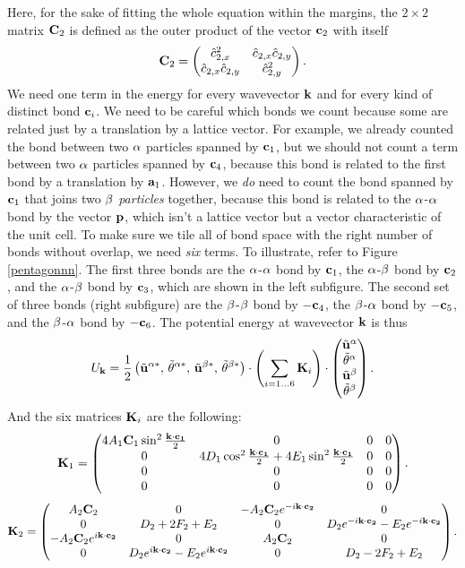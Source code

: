 \documentclass[12pt]{article}
\begin{document}
Here, for the sake of fitting the whole equation within the margins, the 
$2\times 2$ matrix $\mathbf{C}_2$ is defined as the outer product of the vector $\mathbf{c}_2$ with itself
\[ \mathbf{C}_2 = \left(\begin{matrix} \hat c_{2,x}^2 & \hat c_{2,x}\hat c_{2,y} \\ \hat 
c_{2,x}\hat c_{2,y} & \hat c_{2,y}^2 \end{matrix}\right).\]
We need one term in the energy for every wavevector $\mathbf{k}$ and for every kind 
of distinct bond $\mathbf{c}_i$. We need to be careful which bonds we count because 
some are related just by a translation by a lattice vector. For example, we 
already counted the bond between two $\alpha$ particles spanned by $\mathbf{c}_1$, but 
we should not count a term between two $\alpha$ particles spanned by $\mathbf{c}_4$, 
because this bond is related to the first bond by a translation by $\mathbf{a}_1$. 
However, we \emph{do} need to count the bond spanned by $\mathbf{c}_1$ that joins 
two $\beta$ \emph{particles} together, because this bond is related to the 
$\alpha$-$\alpha$ bond by the vector $\mathbf{p}$, which isn't a lattice vector but a vector 
characteristic of the unit cell. To make sure we tile all of bond space with 
the right number of bonds without overlap, we need \emph{six} terms. To 
illustrate, refer to Figure \ref{pentagonnn}. The first three bonds are the 
$\alpha$-$\alpha$ bond by $\mathbf{c}_1$, the $\alpha$-$\beta$ bond by $\mathbf{c}_2$, and the $\alpha$-$\beta$ 
bond by $\mathbf{c}_3$, which are shown in the left subfigure. The second set of 
three bonds (right subfigure) are the $\beta$-$\beta$ bond by $-\mathbf{c}_4$, the 
$\beta$-$\alpha$ bond by $-\mathbf{c}_5$, and the $\beta$-$\alpha$ bond by $-\mathbf{c}_6$. The 
potential energy at wavevector $\mathbf{k}$ is thus
\[ U_{\mathbf{k}} = \frac{1}{2} \left(\tilde {\mathbf{u}}^{\alpha *} 
, \, \tilde {\theta}^{\alpha *} , \, \tilde {\mathbf{u}}^{\beta *} , \, \tilde {\theta}^{\beta *} \right)\cdot 
\left( \sum_{i=1\ldots 6} \mathbf{K}_i \right) \cdot \left(\begin{matrix}\tilde {\mathbf{u}}^{\alpha} \\ \tilde 
{\theta}^{\alpha} \\ \tilde {\mathbf{u}}^{\beta} \\  \tilde {\theta}^{\beta} \end{matrix}\right).\]
And the six matrices $\mathbf{K}_i$ are the following:
\[ \mathbf{K}_1 = \left(\begin{matrix} 4A_1 \mathbf{C}_1 \sin^2 \frac{\mathbf{k}\cdot\mathbf{c_1}}{2} & 0 & 0 & 0\\ 0 & 
4D_1 \cos^2\frac{\mathbf{k}\cdot\mathbf{c_1}}{2} + 4E_1 \sin^2 \frac{\mathbf{k}\cdot\mathbf{c_1}}{2} & 0 & 0 \\ 
0 & 0 & 0 & 0 \\ 0 & 0 & 0 & 0\end{matrix}\right).\]
\[ \mathbf{K}_2 = \left(\begin{matrix}
 A_2\mathbf{C}_2 & 0 & -A_2 \mathbf{C}_2 e^{-i\mathbf{k}\cdot\mathbf{c_2}} & 0 \\
0 & D_2 + 2F_2 + E_2 & 0 & D_2e^{-i\mathbf{k}\cdot\mathbf{c_2}} - 
E_2e^{-i\mathbf{k}\cdot\mathbf{c_2}} \\
-A_2 \mathbf{C}_2 e^{i\mathbf{k}\cdot\mathbf{c_2}} & 0 & A_2 \mathbf{C}_2 & 0  \\
0 &  D_2 e^{i\mathbf{k}\cdot\mathbf{c_2}} - E_2 e^{i\mathbf{k}\cdot\mathbf{c_2}} & 0  & D_2 - 2F_2 + 
E_2\end{matrix}\right).\]
\end{document}
